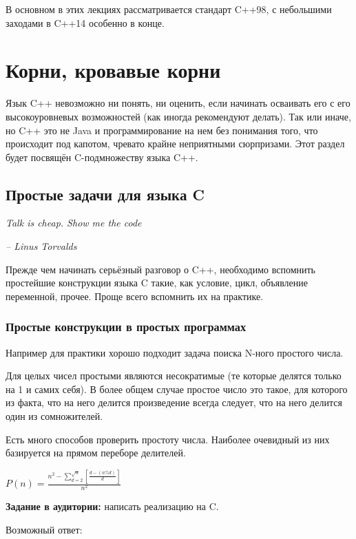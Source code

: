 \documentclass[a4paper,12pt,oneside]{article}
\newif\ifanswers
\begin{document}
В основном в этих лекциях рассматривается стандарт C++98, с небольшими заходами в C++14 особенно в конце.

\pagebreak
\section{Корни, кровавые корни}\label{BloodyRoots}

Язык C++ невозможно ни понять, ни оценить, если начинать осваивать его с его высокоуровневых возможностей (как иногда рекомендуют делать). Так или иначе, но C++ это не Java и программирование на нем без понимания того, что происходит под капотом, чревато крайне неприятными сюрпризами. Этот раздел будет посвящён C-подмножеству языка C++.

\subsection{Простые задачи для языка C}\label{PrimeTasks}

\hfill\textit{Talk is cheap. Show me the code}{\vspace{0.5em}}

\hfill\textit{-- Linus Torvalds}

Прежде чем начинать серьёзный разговор о C++, необходимо вспомнить простейшие конструкции языка C такие, как условие, цикл, объявление переменной, прочее. Проще всего вспомнить их на практике.

\subsubsection{Простые конструкции в простых программах}

Например для практики хорошо подходит задача поиска N-ного простого числа.

Для целых чисел простыми являются несократимые (те которые делятся только на 1 и самих себя). В более общем случае простое число это такое, для которого из факта, что на него делится произведение всегда следует, что на него делится один из сомножителей.

Есть много способов проверить простоту числа. Наиболее очевидный из них базируется на прямом переборе делителей. 

$P(n)=\frac{n^2-\sum\limits_{d=2}^{\sqrt{n}} [\frac{d-(n\%d)}{d}]}{n^2}$

\textbf{Задание в аудитории:} написать реализацию на C.

\ifanswers
Возможный ответ:
\end{document}

